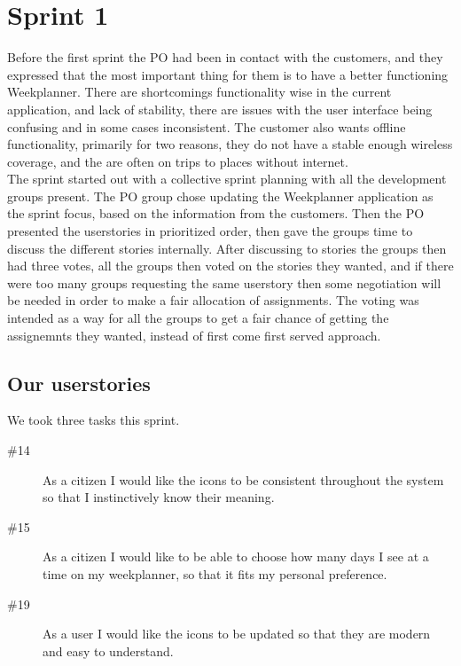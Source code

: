 \chapter{Sprint 1}



Before the first sprint the \gls{PO} had been in contact with the customers, and they expressed that the most important thing for them is to have a better functioning Weekplanner.
There are shortcomings functionality wise  in the current application, and lack of stability, there are issues with the user interface being confusing and in some cases inconsistent. The customer also wants offline functionality, primarily for two reasons, they do not have a stable enough wireless coverage, and the are often on trips to places without internet.
\\
The sprint started out with a collective sprint planning with all the development groups  present. The \gls{PO} group chose updating the Weekplanner application as the sprint focus, based on the information from the customers. Then the \gls{PO} presented the userstories in prioritized order, then gave the groups time to discuss the different stories internally. After discussing to stories the groups then had three votes, all the groups then voted on the stories they wanted, and if there were too many groups requesting the same userstory then some negotiation will be needed in order to make a fair allocation of assignments. The voting was intended as a way for all the groups to get a fair chance of getting the assignemnts they wanted, instead of first come first served approach.\newline

\section{Our userstories}
We took three tasks this sprint.
\begin{description}
    \item [\#14] As a citizen I would like the icons to be consistent throughout the system so that I instinctively know their meaning.
    \item [\#15] As a citizen I would like to be able to choose how many days I see at a time on my weekplanner, so that it fits my personal preference.
    \item [\#19] As a user I would like the icons to be updated so that they are modern and easy to understand.
\end{description}

